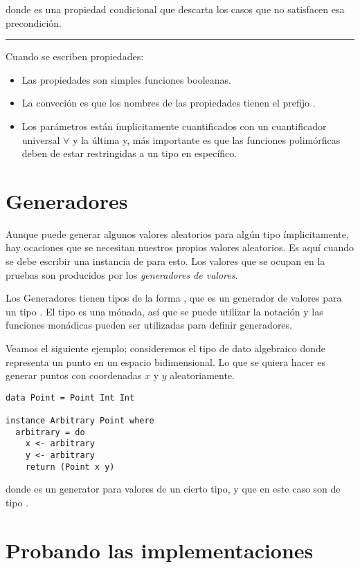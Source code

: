 donde \hsCode{==>} es una propiedad condicional que descarta los casos que no satisfacen esa
precondición.

\noindent\rule{\textwidth}{1pt}

Cuando se escriben propiedades:
\begin{itemize}
\item Las propiedades son simples funciones booleanas.
\item La conveción es que los nombres de las propiedades tienen el prefijo .
\item Los parámetros están ímplicitamente cuantificados con un cuantificador universal $\forall$ y
la última y, más importante es que las funciones polimórficas deben de estar restringidas a un tipo
en específico.
\end{itemize}

\section{Generadores}

Aunque \QuickCheck puede generar algunos valores aleatorios para algún tipo ímplicitamente, hay
ocaciones que se necesitan nuestros propios valores aleatorios. Es aquí cuando se debe escribir
una instancia de  para esto. Los valores que se ocupan en la pruebas son
producidos por los \textit{generadores de valores}.

Los Generadores tienen tipos de la forma , que es un generador de valores para
un tipo . El tipo  es una mónada, así que se puede utilizar la notación 
 y las funciones monádicas pueden ser utilizadas para definir generadores.

Veamos el siguiente ejemplo; consideremos el tipo de dato algebraico  donde
representa un punto en un espacio bidimensional. Lo que se quiera hacer es generar puntos
con coordenadas $x$ y $y$ aleatoriamente.

\begin{verbatim}
data Point = Point Int Int

instance Arbitrary Point where
  arbitrary = do
    x <- arbitrary
    y <- arbitrary
    return (Point x y)
\end{verbatim}

donde  es un generator para valores de un cierto tipo, y que en este
caso son de tipo .

\section{Probando las implementaciones}

